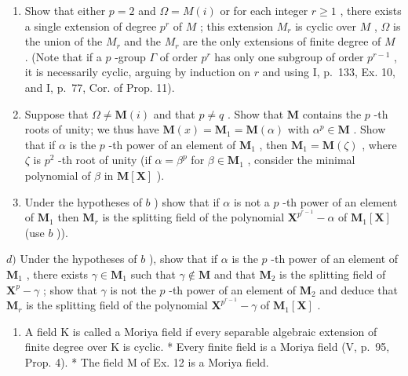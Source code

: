 \begin{enumerate}
\def\labelenumi{\alph{enumi})}
\item
  Show that either \(p = 2\) and \(\Omega = M(i)\) or for each integer \(r \geqslant 1\) , there exists a single extension of degree \(p^r\) of \(M\) ; this extension \(M_r\) is cyclic over \(M\) , \(\Omega\) is the union of the \(M_r\) and the \(M_r\) are the only extensions of finite degree of \(M\) . (Note that if a \(p\) -group \(\Gamma\) of order \(p^r\) has only one subgroup of order \(p^{r-1}\) , it is necessarily cyclic, arguing by induction on \(r\) and using I, p.~133, Ex. 10, and I, p.~77, Cor. of Prop. 11).
\item
  Suppose that \(\Omega \neq \mathbf{M}(i)\) and that \(p \neq q\) . Show that \(\mathbf{M}\) contains the \(p\) -th roots of unity; we thus have \(\mathbf{M}(x) = \mathbf{M}_1 = \mathbf{M}(\alpha)\) with \(\alpha^p \in \mathbf{M}\) . Show that if \(\alpha\) is the \(p\) -th power of an element of \(\mathbf{M}_1\) , then \(\mathbf{M}_1 = \mathbf{M}(\zeta)\) , where \(\zeta\) is \(p^2\) -th root of unity (if \(\alpha = \beta^p\) for \(\beta \in \mathbf{M}_1\) , consider the minimal polynomial of \(\beta\) in \(\mathbf{M}[\mathbf{X}]\) ).
\item
  Under the hypotheses of \(b\) ) show that if \(\alpha\) is not a \(p\) -th power of an element of \(\mathbf{M}_1\) then \(\mathbf{M}_r\) is the splitting field of the polynomial \(\mathbf{X}^{p^{r-1}} - \alpha\) of \(\mathbf{M}_1[\mathbf{X}]\) (use \(b\) )).
\end{enumerate}

\(d)\) Under the hypotheses of \(b\) ), show that if \(\alpha\) is the \(p\) -th power of an element of \(\mathbf{M}_1\) , there exists \(\gamma \in \mathbf{M}_1\) such that \(\gamma \notin \mathbf{M}\) and that \(\mathbf{M}_2\) is the splitting field of \(\mathbf{X}^p - \gamma\) ; show that \(\gamma\) is not the \(p\) -th power of an element of \(\mathbf{M}_2\) and deduce that \(\mathbf{M}_r\) is the splitting field of the polynomial \(\mathbf{X}^{p^{r-1}} - \gamma\) of \(\mathbf{M}_1[\mathbf{X}]\) .

\begin{enumerate}
\def\labelenumi{\arabic{enumi})}
\setcounter{enumi}{12}
\tightlist
\item
  A field K is called a Moriya field if every separable algebraic extension of finite degree over K is cyclic. * Every finite field is a Moriya field (V, p.~95, Prop. 4). * The field M of Ex. 12 is a Moriya field.
\end{enumerate}

